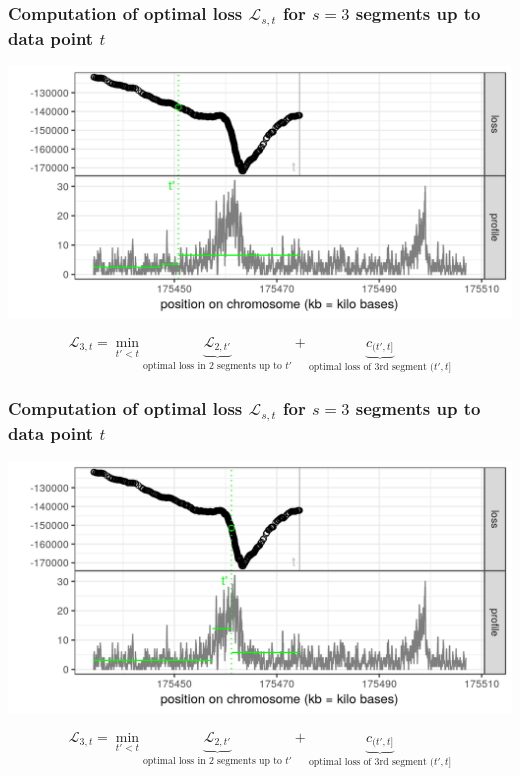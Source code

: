 
\begin{frame}
\frametitle{Computation of optimal loss $\mathcal L_{s, t}$
 for $s=3$ segments up to data point $t$}
  \includegraphics[width=\textwidth]{figure-dp-third-1.png}

$$
\mathcal L_{3, t} =
\min_{
  t' < t
}
\underbrace{
  \mathcal L_{2, t'}
}_{
  \text{optimal loss in 2 segments up to $t'$}
}
+
\underbrace{
  c_{(t', t]}
}_{
  \text{optimal loss of 3rd segment $(t', t]$}
}
$$

\end{frame}
 
\begin{frame}
\frametitle{Computation of optimal loss $\mathcal L_{s, t}$
 for $s=3$ segments up to data point $t$}
  \includegraphics[width=\textwidth]{figure-dp-third-2.png}

$$
\mathcal L_{3, t} =
\min_{
  t' < t
}
\underbrace{
  \mathcal L_{2, t'}
}_{
  \text{optimal loss in 2 segments up to $t'$}
}
+
\underbrace{
  c_{(t', t]}
}_{
  \text{optimal loss of 3rd segment $(t', t]$}
}
$$

\end{frame}
 
